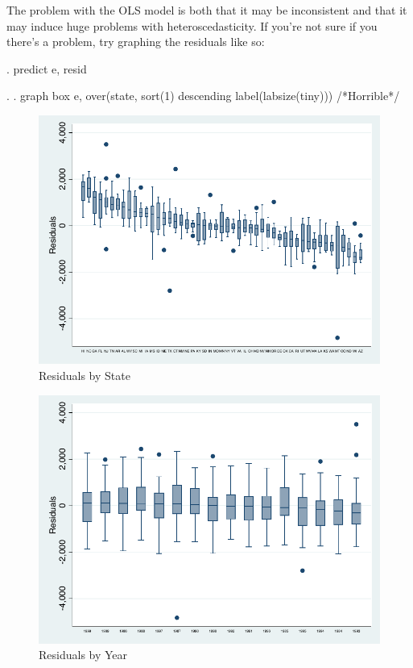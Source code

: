 \documentclass[12pt]{article}
\begin{document}
The problem with the OLS model is both that it may be inconsistent and
that it may induce huge problems with heteroscedasticity. If you're
not sure if you there's a problem, try graphing the residuals like so: 


\begin{stlog}
  . predict e, resid

. 
. graph box e, over(state, sort(1) descending label(labsize(tiny))) /*Horrible*/

\end{stlog}


\begin{figure}[h]
  \centering
  \includegraphics[width=\textwidth]{resid_state}
  \caption{Residuals by State}
\end{figure}


\begin{figure}[h]
  \centering
  \includegraphics[width=\textwidth]{resid_year}
  \caption{Residuals by Year}
\end{figure}
\end{document}
